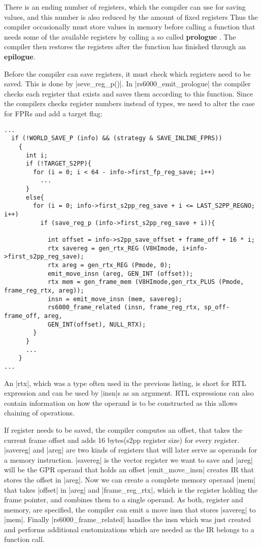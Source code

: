 There is an ending number of registers, which the compiler can use for saving values, and this number is also reduced by the amount of fixed registers
Thus the compiler occasionally must store values in memory before calling a function that needs some of the available registers by calling a so called \textbf{prologue} \citep{GCCint:funcentry}.
The compiler then restores the registers after the function has finished through an \textbf{epilogue}.

Before the compiler can save registers, it must check which registers need to be saved.
This is done by |seve_reg_p()|.
In |rs6000_emit_prologue| the compiler checks each register that exists and saves them according to this function.
Since the compilers checks register numbers instead of types, we need to alter the case for FPRs and add a target flag:
\begin{lstlisting}
...
  if (!WORLD_SAVE_P (info) && (strategy & SAVE_INLINE_FPRS))
    {
      int i;
      if (!TARGET_S2PP){
        for (i = 0; i < 64 - info->first_fp_reg_save; i++)
          ...
      }
      else{
        for (i = 0; info->first_s2pp_reg_save + i <= LAST_S2PP_REGNO; i++)
          if (save_reg_p (info->first_s2pp_reg_save + i)){

            int offset = info->s2pp_save_offset + frame_off + 16 * i;
            rtx savereg = gen_rtx_REG (V8HImode, i+info->first_s2pp_reg_save);
            rtx areg = gen_rtx_REG (Pmode, 0);
            emit_move_insn (areg, GEN_INT (offset));
            rtx mem = gen_frame_mem (V8HImode,gen_rtx_PLUS (Pmode, frame_reg_rtx, areg));
            insn = emit_move_insn (mem, savereg);
            rs6000_frame_related (insn, frame_reg_rtx, sp_off-frame_off, areg,
            GEN_INT(offset), NULL_RTX);
        }
      }
      ...
    }
...
\end{lstlisting}
An |rtx|, which was a type often used in the previous listing, is short for RTL expression and can be used by |insn|s as an argument.
RTL expressions can also contain information on how the operand is to be constructed as this allows chaining of operations.

If register needs to be saved, the compiler computes an offset, that takes the current frame offset and adds 16 bytes(s2pp register size) for every register.
|savereg| and |areg| are two kinds of registers that will later serve as operands for a memory instruction.
|savereg| is the vector register we want to save and |areg| will be the GPR operand that holds an offset
|emit_move_insn| creates IR that stores the offset in |areg|.
Now we can create a complete memory operand |mem| that takes |offset| in |areg| and |frame_reg_rtx|, which is the register holding the frame pointer, and combines them to a single operand.
As both, register and memory, are specified, the compiler can emit a move insn that stores |savereg| to |mem|.
Finally |rs6000_frame_related| handles the insn which was just created and performs additional customizations which are needed as the IR belongs to a function call.

